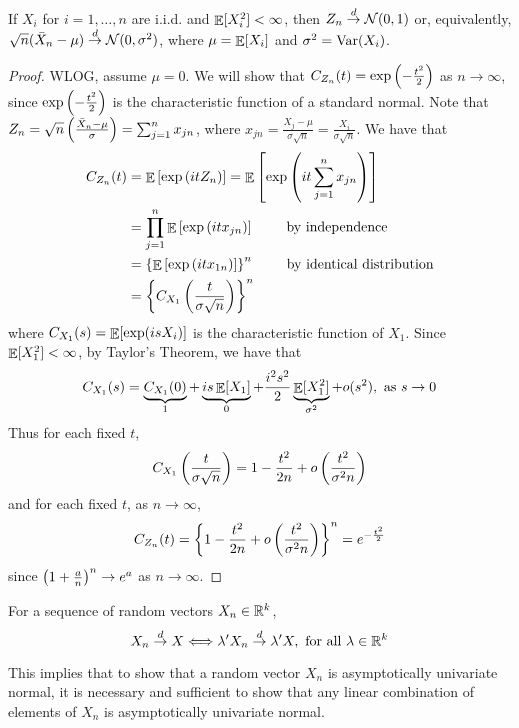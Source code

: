 \documentclass[10pt]{article}
\begin{document}
\begin{theorem}
	 If $X_i$ for $i = 1,\dots,n$ are i.i.d. and $\mathop{\mathbb{E}}[X_i^2] < \infty$, then $Z_n \overset{d}{\to} \mathcal{N}(0,1)$ or, equivalently, $\sqrt{n}(\bar{X}_n - \mu) \overset{d}{\to} \mathcal{N}(0,\sigma^2)$, where $\mu = \mathop{\mathbb{E}}[X_i]$ and $\sigma^2 = \mathop{\rm Var}(X_i)$.
\end{theorem}
\begin{proof}
	WLOG, assume $\mu = 0$. We will show that $C_{Z_n}(t) = \exp\left( -\frac{t^2}{2}\right)$ as $n \to \infty$, since $\exp\left( -\frac{t^2}{2}\right)$ is the characteristic function of a standard normal. Note that $Z_n = \sqrt{n}\left( \frac{\bar{X}_n - \mu}{\sigma}\right) = \sum_{j=1}^n x_{jn}$, where $x_{jn} = \frac{X_j - \mu}{\sigma \sqrt{n}} = \frac{X_i}{\sigma \sqrt{n}}$. We have that
	\begin{align*}
		C_{Z_n}(t) &= \mathop{\mathbb{E}}\left[ \exp\left( i t Z_n\right) \right] = \mathop{\mathbb{E}}\left[ \exp\left( i t \sum_{j=1}^n x_{jn} \right) \right] \\
		&= \prod_{j=1}^n \mathop{\mathbb{E}}\left[ \exp\left( i t x_{jn}\right) \right] \qquad \text{ by independence} \\
		&= \left\{ \mathop{\mathbb{E}} \left[ \exp \left( i t x_{1n}\right) \right] \right\}^n \qquad \text{ by identical distribution} \\
		&= \left\{ C_{X_1} \left( \frac{t}{\sigma \sqrt{n}} \right)\right\}^n
	\end{align*}
	where $C_{X_1}(s) = \mathop{\mathbb{E}}[\exp(is X_i)]$ is the characteristic function of $X_1$. Since $\mathop{\mathbb{E}}[X_1^2] < \infty$, by Taylor's Theorem, we have that
	\[
	C_{X_1}(s) = \underbrace{C_{X_1}(0)}_{1} + \underbrace{i s \mathop{\mathbb{E}}[X_1]}_0 + \frac{i^2 s^2}{2} \underbrace{\mathop{\mathbb{E}}[X_1^2]}_{\sigma^2} + o(s^2), \text{ as } s \to 0
	\]
	Thus for each fixed $t$,
	\[
	C_{X_1}\left( \frac{t}{\sigma \sqrt{n}}\right) = 1 - \frac{t^2}{2n} + o\left( \frac{t^2}{\sigma^2 n}\right)
	\]
	and for each fixed $t$, as $n \to \infty$,
	\[
	C_{Z_n}(t) = \left\{ 1 - \frac{t^2}{2n} + o\left( \frac{t^2}{\sigma^2 n}\right) \right\}^n = e^{-\frac{t^2}{2}}
	\]
	since $\left( 1 + \frac{a}{n}\right)^n \to e^a$ as $n \to \infty$. 
\end{proof}

\begin{theorem}
	 For a sequence of random vectors $X_n \in \mathbb{R}^k$,
	\[
	X_n \overset{d}{\to} X \Longleftrightarrow \lambda' X_n \overset{d}{\to} \lambda' X, \text{ for all } \lambda \in \mathbb{R}^k
	\]
\end{theorem}

\begin{remark}
	This implies that to show that a random vector $X_n$ is asymptotically univariate normal, it is necessary and sufficient to show that any linear combination of elements of $X_n$ is asymptotically univariate normal.
\end{remark}
\end{document}
